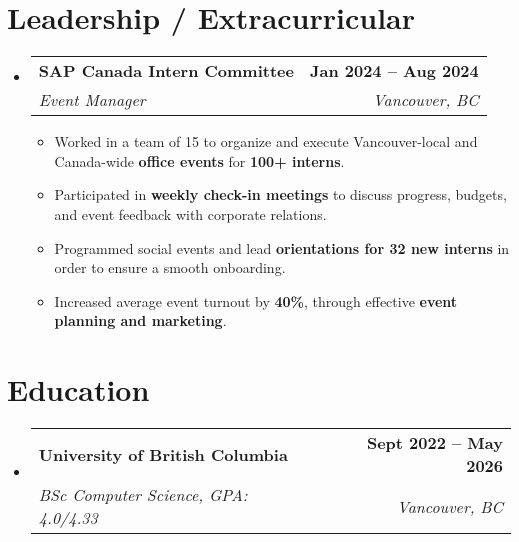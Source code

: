 \documentclass[letterpaper,11pt]{article}
\makeatletter
\newcommand{\bluey}[1]{{\color{customblue}#1}}
\newcommand{\resumeItem}[1]{
  \item\small{
    {#1 \vspace{-2pt}}
  }
}
\newcommand{\resumeSubheading}[4]{
  \vspace{-2pt}\item
    \begin{tabular*}{1.0\textwidth}[t]{l@{\extracolsep{\fill}}r}
      \textbf{#1} & \textbf{\small #2} \\
      \textit{\small#3} & \textit{\small #4} \\
    \end{tabular*}\vspace{-7pt}
}
\newcommand{\resumeSubHeadingListStart}{\begin{itemize}[leftmargin=0.0in, label={}]}
\newcommand{\resumeSubHeadingListEnd}{\end{itemize}}
\newcommand{\resumeItemListStart}{\begin{itemize}}
\newcommand{\resumeItemListEnd}{\end{itemize}\vspace{-5pt}}
\makeatother
\begin{document}
\section{Leadership / Extracurricular}
    \resumeSubHeadingListStart
        \resumeSubheading{\bluey{SAP Canada Intern Committee}}{Jan 2024 -- Aug 2024}{\bluey{Event Manager}}{Vancouver, BC}
            \resumeItemListStart
                \resumeItem{Worked in a team of 15 to organize and execute Vancouver-local and Canada-wide \textbf{office events} for \textbf{100+ interns}.}
                \resumeItem{Participated in \textbf{weekly check-in meetings} to discuss progress, budgets, and event feedback with corporate relations.}
                \resumeItem{Programmed social events and lead \textbf{orientations for 32 new interns} in order to ensure a smooth onboarding.}
                \resumeItem{Increased average event turnout by \textbf{40\%}, through effective \textbf{event planning and marketing}.}
            \resumeItemListEnd
        
    \resumeSubHeadingListEnd

\section{Education}
  \resumeSubHeadingListStart
    \resumeSubheading
      {University of British Columbia}{Sept 2022 -- May 2026}
      {BSc Computer Science, \rm{GPA: 4.0/4.33}}{Vancouver, BC}
  \resumeSubHeadingListEnd

%
\end{document}
